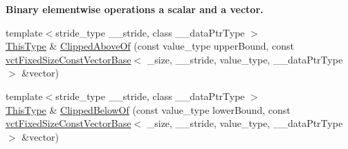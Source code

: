 \begin{Indent}{\bf Binary elementwise operations a scalar and a vector.}
\begin{DoxyCompactItemize}
\item 
{\footnotesize template$<$stride\-\_\-type \-\_\-\-\_\-stride, class \-\_\-\-\_\-data\-Ptr\-Type $>$ }\\\hyperlink{classvct_fixed_size_const_vector_base_a071063bc4fa43112cc287b2dbef53180}{This\-Type} \& \hyperlink{classvct_fixed_size_vector_base_ad2eac3a2f3c6a04df9dfdc92b09833c4}{Clipped\-Above\-Of} (const value\-\_\-type upper\-Bound, const \hyperlink{classvct_fixed_size_const_vector_base}{vct\-Fixed\-Size\-Const\-Vector\-Base}$<$ \-\_\-size, \-\_\-\-\_\-stride, value\-\_\-type, \-\_\-\-\_\-data\-Ptr\-Type $>$ \&vector)
\item 
{\footnotesize template$<$stride\-\_\-type \-\_\-\-\_\-stride, class \-\_\-\-\_\-data\-Ptr\-Type $>$ }\\\hyperlink{classvct_fixed_size_const_vector_base_a071063bc4fa43112cc287b2dbef53180}{This\-Type} \& \hyperlink{classvct_fixed_size_vector_base_ac9f6aefb059c505111998451fa27e2ee}{Clipped\-Below\-Of} (const value\-\_\-type lower\-Bound, const \hyperlink{classvct_fixed_size_const_vector_base}{vct\-Fixed\-Size\-Const\-Vector\-Base}$<$ \-\_\-size, \-\_\-\-\_\-stride, value\-\_\-type, \-\_\-\-\_\-data\-Ptr\-Type $>$ \&vector)
\end{DoxyCompactItemize}
\end{Indent}
